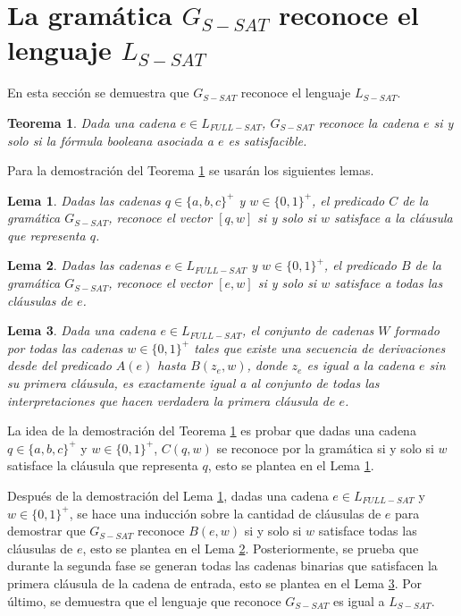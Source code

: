 \documentclass[12pt]{article}
\newtheorem{theorem}{Teorema}
\newtheorem{lemma}{Lema}
\begin{document}
\section{La gramática $G_{S-SAT}$ reconoce el lenguaje $L_{S-SAT}$}

En esta sección se demuestra que $G_{S-SAT}$ reconoce el lenguaje $L_{S-SAT}$.
\begin{theorem}
    \label{teo:gsat}
    Dada una cadena $e\in L_{FULL-SAT}$, $G_{S-SAT}$ reconoce la cadena $e$ si y solo si la fórmula booleana asociada a $e$ es satisfacible. 
\end{theorem}

Para la demostración del Teorema \ref{teo:gsat} se usarán los siguientes lemas.

\begin{lemma}
    \label{lem:predc}
    Dadas las cadenas $q\in \{a,b,c\}^+$ y $w\in \{0,1\}^+$, el predicado $C$ de la gramática $G_{S-SAT}$, reconoce el vector $[q,w]$ si y solo si $w$ satisface a la cláusula que representa $q$.
\end{lemma}

\begin{lemma}
    \label{lem:predb}
    Dadas las cadenas $e\in L_{FULL-SAT}$ y $w\in \{0,1\}^+$, el predicado $B$ de la gramática $G_{S-SAT}$, reconoce el vector $[e,w]$  si y solo si $w$ satisface a todas las cláusulas de $e$.
\end{lemma}

\begin{lemma}
    \label{lem:preda}
    Dada una cadena $e\in L_{FULL-SAT}$, el conjunto de cadenas $W$ formado por todas las cadenas 
    $w\in \{0,1\}^+$ tales que existe una secuencia de derivaciones desde del predicado $A(e)$ hasta 
    $B(z_e,w)$, donde $z_e$ es igual a la cadena $e$ sin su primera cláusula, es exactamente igual a 
    al conjunto de todas las interpretaciones que hacen verdadera la primera cláusula de $e$.
\end{lemma}

La idea de la demostración del Teorema \ref{teo:gsat} es probar que dadas una cadena $q\in \{a,b,c\}^+$ y 
$w\in \{0,1\}^+$, $C(q,w)$ se reconoce por la gramática si y solo si $w$ satisface la cláusula que 
representa $q$, esto se plantea en el Lema \ref{lem:predc}. 

Después de la demostración del Lema \ref{lem:predc}, dadas una cadena $e\in L_{FULL-SAT}$ y $w\in \{0,1\}^+$, se hace una inducción sobre la cantidad de cláusulas de $e$ para demostrar que $G_{S-SAT}$ reconoce $B(e,w)$ si y solo si $w$ satisface todas las cláusulas de $e$, esto se plantea en el Lema \ref{lem:predb}. Posteriormente, se prueba que durante la segunda fase se generan todas las cadenas binarias que satisfacen la primera cláusula de la cadena de entrada, esto se plantea en el Lema \ref{lem:preda}. Por último, se demuestra que el lenguaje que reconoce $G_{S-SAT}$ es igual a $L_{S-SAT}$.
\end{document}

